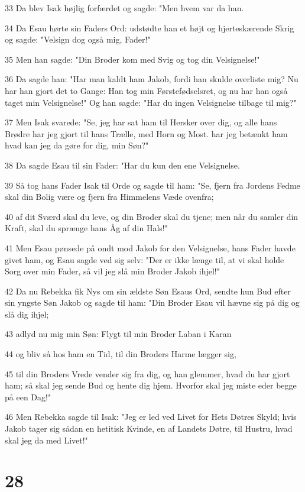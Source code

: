 \par 33 Da blev Isak højlig forfærdet og sagde: "Men hvem var da han.
\par 34 Da Esau hørte sin Faders Ord: udstødte han et højt og hjerteskærende Skrig og sagde: "Velsign dog også mig, Fader!"
\par 35 Men han sagde: "Din Broder kom med Svig og tog din Velsignelse!"
\par 36 Da sagde han: "Har man kaldt ham Jakob, fordi han skulde overliste mig? Nu har han gjort det to Gange: Han tog min Førstefødselsret, og nu har han også taget min Velsignelse!" Og han sagde: "Har du ingen Velsignelse tilbage til mig?"
\par 37 Men Isak svarede: "Se, jeg har sat ham til Hersker over dig, og alle hans Brødre har jeg gjort til hans Trælle, med Horn og Most. har jeg betænkt ham hvad kan jeg da gøre for dig, min Søn?"
\par 38 Da sagde Esau til sin Fader: "Har du kun den ene Velsignelse.
\par 39 Så tog hans Fader Isak til Orde og sagde til ham: "Se, fjern fra Jordens Fedme skal din Bolig være og fjern fra Himmelens Væde ovenfra;
\par 40 af dit Sværd skal du leve, og din Broder skal du tjene; men når du samler din Kraft, skal du sprænge hans Åg af din Hals!"
\par 41 Men Esau pønsede på ondt mod Jakob for den Velsignelse, hans Fader havde givet ham, og Esau sagde ved sig selv: "Der er ikke længe til, at vi skal holde Sorg over min Fader, så vil jeg slå min Broder Jakob ihjel!"
\par 42 Da nu Rebekka fik Nys om sin ældste Søn Esaus Ord, sendte hun Bud efter sin yngste Søn Jakob og sagde til ham: "Din Broder Esau vil hævne sig på dig og slå dig ihjel;
\par 43 adlyd nu mig min Søn: Flygt til min Broder Laban i Karan
\par 44 og bliv så hos ham en Tid, til din Broders Harme lægger sig,
\par 45 til din Broders Vrede vender sig fra dig, og han glemmer, hvad du har gjort ham; så skal jeg sende Bud og hente dig hjem. Hvorfor skal jeg miste eder begge på een Dag!"
\par 46 Men Rebekka sagde til Isak: "Jeg er led ved Livet for Hets Døtres Skyld; hvis Jakob tager sig sådan en hetitisk Kvinde, en af Landets Døtre, til Hustru, hvad skal jeg da med Livet!"

\chapter{28}


